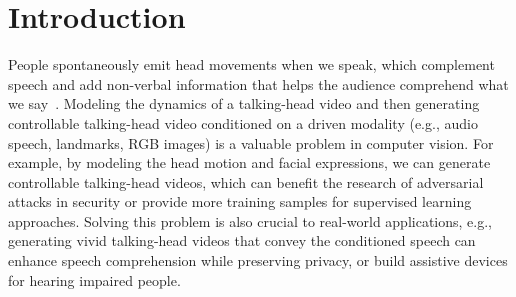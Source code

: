 \documentclass[runningheads]{llncs}
\providecommand{\CXu}[1]{\textcolor{red}{[{\bf #1}]}}
\begin{document}
\section{Introduction}
\label{sec:intro}


People spontaneously emit head movements when we speak, which complement speech and add non-verbal information that helps the audience comprehend what we say~\cite{cassell1999speech,ginosar2019gestures}. Modeling the dynamics of a talking-head video and then generating controllable talking-head video conditioned on a driven modality (e.g., audio speech, landmarks, RGB images) is a valuable problem in computer vision. For example, by modeling the head motion and facial expressions, we can generate controllable talking-head videos, which can benefit the research of adversarial attacks in security or provide more training samples for supervised learning approaches. Solving this problem is also crucial to real-world applications, e.g., generating vivid talking-head videos that convey the conditioned speech can enhance speech comprehension while preserving privacy, or build assistive devices for hearing impaired people. 
\end{document}
